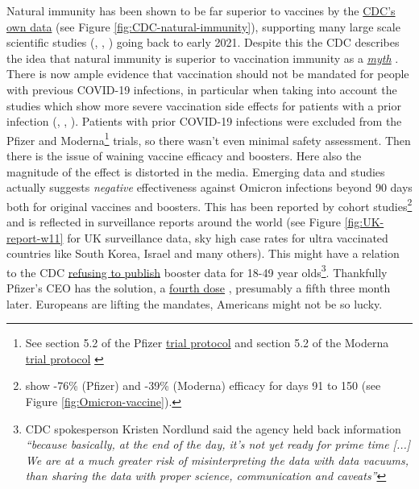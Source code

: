 \documentclass[11pt,a4paper,notitlepage]{report}
\begin{document}
Natural immunity has been shown to be far superior to vaccines by the \href{https://www.cdc.gov/mmwr/volumes/71/wr/mm7104e1.htm#F1_down}{CDC's own data} \cite{cdc28012020} (see Figure \ref{fig:CDC-natural-immunity}), supporting many large scale scientific studies (\cite{Gazit2021.08.24.21262415}, \cite{doi:10.1126/science.abf4063}, \cite{Goldberg2021.04.20.21255670}) going back to early 2021. Despite this the CDC describes the idea that natural immunity is superior to vaccination immunity as a \href{https://www.cdc.gov/coronavirus/2019-ncov/vaccines/facts.html}{\textit{myth}} \cite{cdc15122021} . There is now ample evidence that vaccination should not be mandated for people with previous COVID-19 infections, in particular when taking into account the studies which show more severe vaccination side effects for patients with a prior infection (\cite{Monforte2021}, \cite{LI20221082}, \cite{Raw22}). Patients with prior COVID-19 infections were excluded from the Pfizer and Moderna\footnote{See section 5.2 of the Pfizer \href{https://cdn.pfizer.com/pfizercom/2020-11/C4591001_Clinical_Protocol_Nov2020.pdf}{trial protocol} \cite{pfizer102020} and section 5.2 of the Moderna \href{https://www.modernatx.com/sites/default/files/mRNA-1273-P301-Protocol.pdf}{trial protocol} \cite{moderna102020}} trials, so there wasn't even minimal safety assessment. Then there is the issue of waining vaccine efficacy and boosters. Here also the magnitude of the effect is distorted in the media. Emerging data and studies actually suggests \textit{negative} effectiveness against Omicron infections beyond 90 days both for original vaccines and boosters. This has been reported by cohort studies\footnote{\citet{Hansen2021.12.20.21267966} show -76\% (Pfizer) and -39\% (Moderna) efficacy for days 91 to 150 (see Figure \ref{fig:Omicron-vaccine}).} and is reflected in surveillance reports around the world (see Figure \ref{fig:UK-report-w11} for UK surveillance data, sky high case rates for ultra vaccinated countries like South Korea, Israel and many others). This might have a relation to the CDC \href{https://www.webmd.com/lung/news/20220222/report-cdc-not-publishing-large-amounts-of-covid-19-data}{refusing to publish} \cite{webmd22022022} booster data for 18-49 year olds\footnote{CDC spokesperson Kristen Nordlund said the agency held back information \textit{“because basically, at the end of the day, it’s not yet ready for prime time [...] We are at a much greater risk of misinterpreting the data with data vacuums, than sharing the data with proper science, communication and caveats”}}. Thankfully Pfizer's CEO has the solution, a \href{https://www.cbsnews.com/news/covid-vaccine-fourth-dose-booster-pfizer-ceo-albert-bourla/}{fourth dose} \cite{cbsnews14032022}, presumably a fifth three month later. Europeans are lifting the mandates, Americans might not be so lucky.
\end{document}
